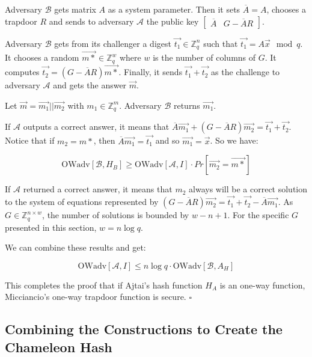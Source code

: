 \documentclass[a4paper]{article}
\newcommand*{\qed}{\hfill\ensuremath{\square}}
\begin{document}
Adversary $\mathcal{B}$ gets matrix $A$ as a system parameter. Then it
sets $\overline{A}=A$, chooses a trapdoor $R$ and sends to adversary
$\mathcal{A}$ the public key $\begin{bmatrix}\overline{A} &
  G-\overline{A}R\end{bmatrix}$.

Adversary $\mathcal{B}$ gets from its challenger a digest
$\overrightarrow{t_1} \in \mathbb{Z}_q^n$ such that
$\overrightarrow{t_1}=A\overrightarrow{x} \mod q$. It chooses a random
$\overrightarrow{m*} \in \mathbb{Z}_q^{w}$ where $w$ is the number of
columns of $G$. It computes $\overrightarrow{t_2} =
(G-\overline{A}R)\overrightarrow{m*}$. Finally, it sends
$\overrightarrow{t_1}+\overrightarrow{t_2}$ as the challenge to
adversary $\mathcal{A}$ and gets the answer $\overrightarrow{m}$.

Let $\overrightarrow{m}=\overrightarrow{m_1}||\overrightarrow{m_2}$
with $m_1 \in \mathbb{Z}_q^m$. Adversary $\mathcal{B}$ returns
$\overrightarrow{m_1}$.

If $\mathcal{A}$ outputs a correct answer, it means that
$\overline{A}\overrightarrow{m_1} +
(G-\overline{A}R)\overrightarrow{m_2}=\overrightarrow{t_1} +
\overrightarrow{t_2}$. Notice that if $m_2=m*$, then
$\overline{A}\overrightarrow{m_1}=\overrightarrow{t_1}$ and so
$\overrightarrow{m_1}=\overrightarrow{x}$. So we have:

$$ \textrm{OWadv}[\mathcal{B},H_B] \geq \textrm{OWadv}[\mathcal{A},
  I]\cdot Pr[\overrightarrow{m_2}=\overrightarrow{m*}]
$$

If $\mathcal{A}$ returned a correct answer, it means that $m_2$ always
will be a correct solution to the system of equations represented by
$(G-\overline{A}R)\overrightarrow{m_2} =
\overrightarrow{t_1}+\overrightarrow{t_2} -
\overline{A}\overrightarrow{m_1}$. As $G \in \mathbb{Z}_q^{n \times
  w}$, the number of solutions is bounded by $w-n+1$. For the specific
$G$ presented in this section, $w=n\log q$.

We can combine these results and get:

$$ \textrm{OWadv}[\mathcal{A},I] \leq n\log q \cdot
\textrm{OWadv}[\mathcal{B}, A_H]
$$

This completes the proof that if Ajtai's hash function $H_A$ is an
one-way function, Micciancio's one-way trapdoor function is
secure. \qed


\subsection{Combining the Constructions to Create the Chameleon Hash}
\end{document}
